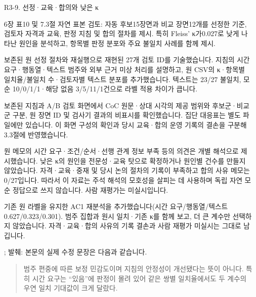 \begin{reviewitem}{R3-9. 선정·교육·합의와 낮은 κ}

\begin{reviewercomment}

6장 표10 및 7.3절 자연 표본 검토: 자동 후보15장면과 비교 장면12개를 선정한 기준, 검토자 자격과 교육, 판정 지침 및 합의 절차를 제시. 특히 Fleiss' κ가0.027로 낮게 나타난 원인을 분석하고, 항목별 판정 분포와 주요 불일치 사례를 함께 제시.

\end{reviewercomment}

\begin{authorresponse}

보존된 원 선정 절차와 재실행으로 재현된 27개 검토 ID를 기술했습니다. 지침의 시간 요구·행동열·텍스트 범주와 외부 근거 미상 처리를 설명하고, 원 CSV의 κ·항목별 일치율/불일치 수·검토자별 텍스트 분포를 추가했습니다. 텍스트는 23/27 불일치, 모순 10/0/1/1·해당 없음 3/5/11/1건으로 라벨 적용 차이가 큽니다.

보존된 지침과 A/B 검토 화면에서 CoC 원문·상대 시각의 제공 범위와 후보군·비교군 구분, 원 장면 ID 및 검사기 결과의 비표시를 확인했습니다. 집단 대응표는 별도 파일에만 있습니다. 이 화면 구성의 확인과 당시 교육·합의 운영 기록의 결손을 구분해 3.3절에 반영했습니다.

원 메모의 시간 요구·조건/순서·선행 관계 정보 부족 등의 의견은 개별 해석으로 제시했습니다. 낮은 κ의 원인을 전문성·교육 탓으로 확정하거나 원인별 건수를 만들지 않았습니다. 자격·교육·중재 및 당시 논의 절차의 기록이 부족하고 합의 사유 메모는 0/27입니다. 따라서 이 자료는 주석 해석의 모호성을 살피는 데 사용하며 독립 자연 모순 정답으로 쓰지 않습니다. 사람 재평가는 미실시입니다.

기존 원 라벨을 유지한 AC1 재분석을 추가했습니다(시간 요구/행동열/텍스트 0.627/0.323/0.301). 범주 집합과 원시 일치·기존 κ를 함께 보고, 더 큰 계수만 선택하지 않았습니다. 자격·교육·합의 사유의 기록 결손과 사람 재평가 미실시는 그대로 남깁니다.

\end{authorresponse}

\begin{manuscriptrevision}{; 발췌: }
본문의 실제 수정 문장은 다음과 같습니다.

\begin{quote}
범주 편중에 따른 보정 민감도이며 지침의 안정성이 개선됐다는 뜻이 아니다. 특히 시간 요구는 ``있음''에 판정이 몰려 있어 같은 쌍별 일치율에서도 두 계수의 우연 일치 기대값이 크게 달랐다.
\end{quote}
\end{manuscriptrevision}

\end{reviewitem}


